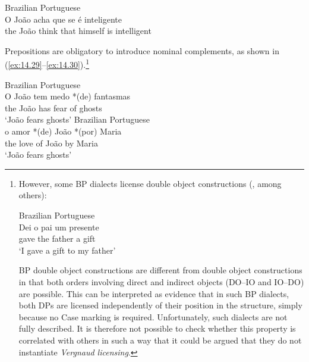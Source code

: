 \documentclass[output=paper]{langsci/langscibook}
\begin{document}
\ea\label{ex:14.28}Brazilian Portuguese\\
    \gll    \llap{*}O João acha que se é inteligente\\
            the João think that himself is intelligent\\
\z


Prepositions are obligatory to introduce nominal complements, as shown in
(\ref{ex:14.29}--\ref{ex:14.30}).\footnote{However, some \gls{BP}
    dialects license double object constructions
    (\citealt{Scher1996,LucchesiMello2009}, among others):

\begin{exe}
    Brazilian Portuguese\\
    \gll    Dei o pai um presente\\
            gave the father a gift\\
    \glt    ‘I gave a gift to my father’
\end{exe}

\gls{BP} double object constructions are different from  double object
constructions in that both orders involving direct and indirect objects
(\gls{DO}--\gls{IO} and \gls{IO}--\gls{DO}) are
possible. This can be interpreted as evidence that in such \gls{BP} dialects,
both DPs are licensed independently of their position in the structure, simply
because no Case marking is required.  Unfortunately, such dialects are not
fully described. It is therefore not possible to check whether this property is
correlated with others in such a way that it could be argued that they do not
instantiate \emph{Vergnaud licensing}.}

\ea\label{ex:14.29}Brazilian Portuguese\\
    \gll    \llap{*}O João tem medo *(de) fantasmas\\
            the João has fear \hphantom{*(}of ghosts\\
    \glt    \enquote*{João fears ghosts}
\ex\label{ex:14.30}Brazilian Portuguese\\
    \gll    o amor *(de) João *(por) Maria\\
            the love \hphantom{*(}of João \hphantom{*(}by Maria\\
    \glt    \enquote*{João fears ghosts}
\z
\end{document}
